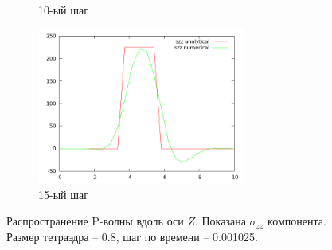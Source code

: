 \begin{figure}[H]
\begin{subfigure}[b]{0.5\textwidth}
\caption{10-ый шаг}
\end{subfigure}
\begin{subfigure}[b]{0.5\textwidth}
\centering
\includegraphics[width=0.75\textwidth]{png/veryfication/0.8/p-wave-along-z15.png}
\caption{15-ый шаг}
\end{subfigure}
\caption{Распространение P-волны вдоль оси $Z$. Показана $\sigma_{zz}$ компонента. Размер тетраэдра -- 0.8, шаг по времени -- 0.001025. }
\label{pic:p_wave_along_z8}
\end{figure}

